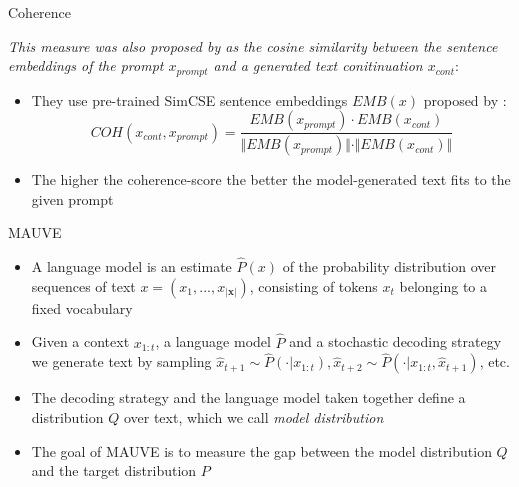 \begin{vbframe}{Coherence}

\textit{This measure was also proposed by  as the cosine similarity between the sentence embeddings of the prompt $x_{prompt}$ and a generated text conitinuation $x_{cont}$}:

\begin{itemize}
    \item They use pre-trained SimCSE sentence embeddings $EMB(x)$ proposed by :
    $$COH(x_{cont}, x_{prompt}) = \frac{EMB(x_{prompt}) \cdot EMB(x_{cont})}{\Vert EMB(x_{prompt})\Vert \cdot \Vert EMB(x_{cont})\Vert}$$
    \item The higher the coherence-score the better the model-generated text fits to the given prompt
\end{itemize}
    
\end{vbframe}


\begin{vbframe}{MAUVE}

\vfill

\begin{itemize}
    \item A language model is an estimate $\hat{P}(x)$ of the probability distribution over sequences of text $x = (x_1, . . ., x_{|\mathbf{x}|})$, consisting of tokens $x_t$ belonging to a fixed vocabulary
    \item Given a context $x_{1:t}$, a language model $\hat{P}$ and a stochastic decoding strategy we generate text by sampling $\hat{x}_{t+1} \sim \hat{P}(\cdot|x_{1:t}), \hat{x}_{t+2} \sim \hat{P}(\cdot|x_{1:t}, \hat{x}_{t+1})$, etc.
    \item The decoding strategy and the language model taken together define a distribution $Q$ over text, which we call \textit{model distribution}
    \item The goal of MAUVE is to measure the gap between the model distribution $Q$ and the target distribution $P$
\end{itemize}

\vfill
    
\end{vbframe}

